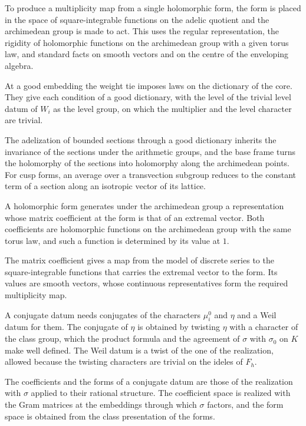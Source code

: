 To produce a multiplicity map from a single holomorphic form, the form is placed in the space of
square-integrable functions on the adelic quotient and the archimedean group is made to act. This uses
the regular representation, the rigidity of holomorphic functions on the archimedean group with a given
torus law, and standard facts on smooth vectors and on the centre of the enveloping algebra.

At a good embedding the weight tie imposes laws on the dictionary of the core. They give each condition
of a good dictionary, with the level of the trivial level datum of $W_i$ as the level group, on which
the multiplier and the level character are trivial.

The adelization of bounded sections through a good dictionary inherits the invariance of the sections
under the arithmetic groups, and the base frame turns the holomorphy of the sections into holomorphy
along the archimedean points. For cusp forms, an average over a transvection subgroup reduces to the
constant term of a section along an isotropic vector of its lattice.

A holomorphic form generates under the archimedean group a representation whose matrix coefficient at
the form is that of an extremal vector. Both coefficients are holomorphic functions on the archimedean
group with the same torus law, and such a function is determined by its value at $1$.

The matrix coefficient gives a map from the model of discrete series to the square-integrable functions
that carries the extremal vector to the form. Its values are smooth vectors, whose continuous
representatives form the required multiplicity map.

A conjugate datum needs conjugates of the characters $\mu^0_i$ and $\eta$ and a Weil datum for them.
The conjugate of $\eta$ is obtained by twisting $\eta$ with a character of the class group, which the
product formula and the agreement of $\sigma$ with $\sigma_0$ on $K$ make well defined. The Weil datum is
a twist of the one of the realization, allowed because the twisting characters are trivial on the
ideles of $F_h$.

The coefficients and the forms of a conjugate datum are those of the realization with $\sigma$ applied
to their rational structure. The coefficient space is realized with the Gram matrices at the embeddings
through which $\sigma$ factors, and the form space is obtained from the class presentation of the forms.

